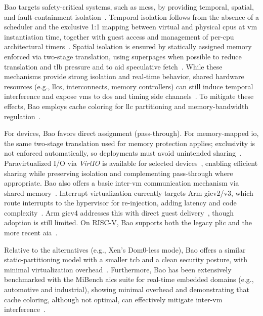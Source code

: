 Bao targets safety-critical systems, such as \glspl{mcs}, by providing
temporal, spatial, and fault-containment isolation~\cite{martins_et_al:OASIcs:2020:11779}. Temporal isolation follows
from the absence of a scheduler and the exclusive 1:1 mapping between virtual
and physical \glspl{cpu} at \gls{vm} instantiation time, together with guest
access and management of per-\gls{cpu} architectural timers~\cite{martins_et_al:OASIcs:2020:11779}. Spatial isolation is ensured by
statically assigned memory enforced via two-stage translation, using superpages
when possible to reduce translation and \gls{tlb} pressure and to aid
speculative fetch~\cite{martins_et_al:OASIcs:2020:11779}. While these mechanisms provide strong isolation and real-time
behavior, shared hardware resources (e.g., \glspl{llc}, interconnects, memory
controllers) can still induce temporal interference and expose \glspl{vm} to
\gls{dos} and timing side
channels~\cite{bansal2018evaluating,barham2003xen,ge2018survey}. To mitigate
these effects, Bao employs cache coloring for \gls{llc} partitioning and
memory-bandwidth regulation~\cite{martins_et_al:OASIcs:2020:11779}.

For devices, Bao favors direct assignment (pass-through). For memory-mapped
\gls{io}, the same two-stage translation used for memory protection applies;
exclusivity is not enforced automatically, so deployments must avoid unintended
sharing~\cite{martins_et_al:OASIcs:2020:11779}. Paravirtualized I/O via
\emph{VirtIO} is available for selected
devices~\cite{costa2022virtio,ribeiro2023virtio,rocha_mitigating_2023,peixoto-virtio-2024,baoRepo},
enabling efficient sharing while preserving isolation and complementing
pass-through where appropriate. Bao also offers a basic inter-\gls{vm}
communication mechanism via shared
memory~\cite{martins_et_al:OASIcs:2020:11779,baoEmbeddedWorld2020}.
%
Interrupt virtualization currently targets Arm \gls{gic}v2/v3, which route
interrupts to the hypervisor for re-injection, adding latency and code
complexity~\cite{martins_et_al:OASIcs:2020:11779}. Arm \gls{gic}v4 addresses
this with direct guest delivery~\cite{arm-gicv4,dall2018design}, though adoption
is still limited. On
RISC-V, Bao supports both the legacy \gls{plic} and the more recent
\gls{aia}~\cite{marques_interrupting_2024,baoRepo}.

Relative to the alternatives (e.g., Xen’s Dom0-less mode), Bao offers a similar
static-partitioning model with a smaller \gls{tcb} and a clean security posture,
with minimal virtualization
overhead~\cite{martins_et_al:OASIcs:2020:11779}. Furthermore, Bao
has been extensively benchmarked with the MiBench \gls{aics} suite for real-time
embedded domains (e.g., automotive and industrial), showing minimal overhead and
demonstrating that cache coloring, although not optimal, can effectively
mitigate inter-\gls{vm} interference~\cite{martins2023shedding}.

